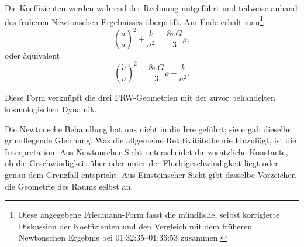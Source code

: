 \begin{classroomqa}
\end{classroomqa}

Die Koeffizienten werden während der Rechnung mitgeführt und teilweise anhand des früheren Newtonschen Ergebnisses überprüft. Am Ende erhält man\footnote{Diese angegebene Friedmann-Form fasst die mündliche, selbst korrigierte Diskussion der Koeffizienten und den Vergleich mit dem früheren Newtonschen Ergebnis bei 01:32:35--01:36:53 zusammen.}
\begin{equation}
\left(\frac{\dot a}{a}\right)^2+\frac{k}{a^2}=\frac{8\pi G}{3}\rho,
\end{equation}
oder äquivalent
\begin{equation}
\left(\frac{\dot a}{a}\right)^2=\frac{8\pi G}{3}\rho-\frac{k}{a^2}.
\end{equation}

Diese Form verknüpft die drei FRW-Geometrien mit der zuvor behandelten kosmologischen Dynamik.

\begin{classroomqa}
\end{classroomqa}

\begin{classroomqa}
\end{classroomqa}

Die Newtonsche Behandlung hat uns nicht in die Irre geführt; sie ergab dieselbe grundlegende Gleichung. Was die allgemeine Relativitätstheorie hinzufügt, ist die Interpretation. Aus Newtonscher Sicht unterscheidet die zusätzliche Konstante, ob die Geschwindigkeit über oder unter der Fluchtgeschwindigkeit liegt oder genau dem Grenzfall entspricht. Aus Einsteinscher Sicht gibt dasselbe Vorzeichen die Geometrie des Raums selbst an.

